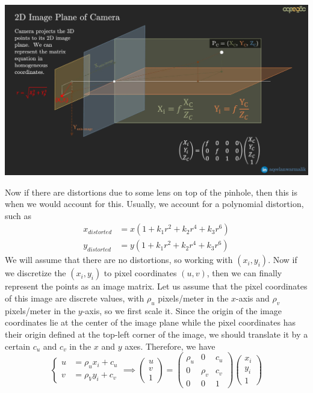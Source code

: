 \documentclass{article}
\theoremstyle{definition}
\theoremstyle{remark}
\theoremstyle{definition}
\begin{document}
\begin{center}
    \includegraphics[scale=0.08]{img/int_matrix.png}
\end{center}
Now if there are distortions due to some lens on top of the pinhole, then this is when we would account for this. Usually, we account for a polynomial distortion, such as 
\begin{align*}
    x_{distorted} & = x (1 + k_1 r^2 + k_2 r^4 + k_3 r^6 ) \\
    y_{distorted} & = y (1 + k_1 r^2 + k_2 r^4 + k_3 r^6 )
\end{align*}
We will assume that there are no distortions, so working with $(x_i, y_i)$. Now if we discretize the $(x_i, y_i)$ to pixel coordinates $(u, v)$, then we can finally represent the points as an image matrix. Let us assume that the pixel coordinates of this image are discrete values, with $\rho_u$ pixels/meter in the $x$-axis and $\rho_v$ pixels/meter in the $y$-axis, so we first scale it. Since the origin of the image coordinates lie at the center of the image plane while the pixel coordinates has their origin defined at the top-left corner of the image, we should translate it by a certain $c_u$ and $c_v$ in the $x$ and $y$ axes. Therefore, we have 
\[\begin{cases} u & = \rho_u x_i + c_u \\ v & = \rho_V y_i + c_v \end{cases} \implies \begin{pmatrix} u \\ v \\ 1 \end{pmatrix} = \begin{pmatrix} \rho_u  & 0 & c_u \\ 0 & \rho_v & c_v \\ 0 & 0 & 1 \end{pmatrix} \begin{pmatrix} x_i \\ y_i \\ 1 \end{pmatrix}\]
\end{document}
